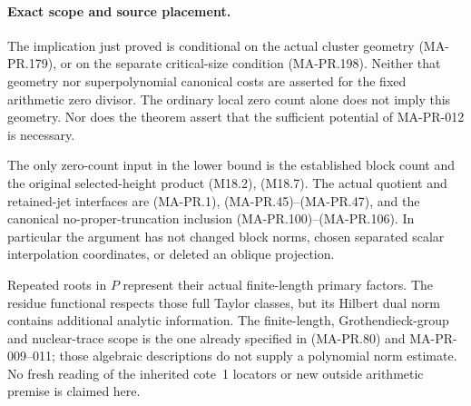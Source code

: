 \paragraph{Exact scope and source placement.}
The implication just proved is conditional on
the actual cluster geometry (MA-PR.179), or on
the separate critical-size condition (MA-PR.198).
Neither that geometry nor superpolynomial
canonical costs are asserted for the fixed
arithmetic zero divisor.  The ordinary local
zero count alone does not imply this geometry.
Nor does the theorem assert that the sufficient
potential of MA-PR-012 is necessary.

The only zero-count input in the lower bound is
the established block count and the original
selected-height product (M18.2), (M18.7).
The actual quotient and retained-jet interfaces
are (MA-PR.1), (MA-PR.45)--(MA-PR.47), and
the canonical no-proper-truncation inclusion
(MA-PR.100)--(MA-PR.106).  In particular the
argument has not changed block norms, chosen
separated scalar interpolation coordinates, or
deleted an oblique projection.

Repeated roots in \(P\) represent their actual
finite-length primary factors.  The residue
functional respects those full Taylor classes,
but its Hilbert dual norm contains additional
analytic information.  The finite-length,
Grothendieck-group and nuclear-trace scope is
the one already specified in (MA-PR.80) and
MA-PR-009--011; those algebraic descriptions
do not supply a polynomial norm estimate.
No fresh reading of the inherited cote~1
locators or new outside arithmetic premise
is claimed here.

